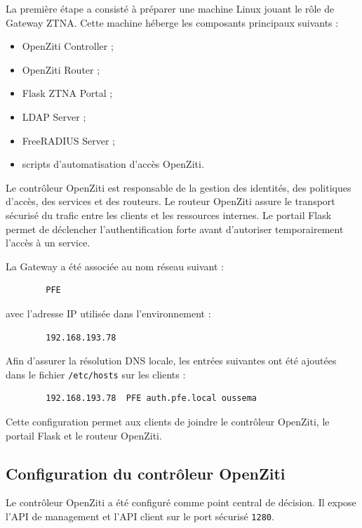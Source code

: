 \documentclass[12pt,a4paper,oneside]{report}
\begin{document}
	La première étape a consisté à préparer une machine Linux jouant le rôle de Gateway ZTNA. Cette machine héberge les composants principaux suivants :
	
	\begin{itemize}
		\item OpenZiti Controller ;
		\item OpenZiti Router ;
		\item Flask ZTNA Portal ;
		\item LDAP Server ;
		\item FreeRADIUS Server ;
		\item scripts d'automatisation d'accès OpenZiti.
	\end{itemize}
	
	Le contrôleur OpenZiti est responsable de la gestion des identités, des politiques d'accès, des services et des routeurs. Le routeur OpenZiti assure le transport sécurisé du trafic entre les clients et les ressources internes. Le portail Flask permet de déclencher l'authentification forte avant d'autoriser temporairement l'accès à un service.
	
	La Gateway a été associée au nom réseau suivant :
	
	\begin{lstlisting}
		PFE
	\end{lstlisting}
	
	avec l'adresse IP utilisée dans l'environnement :
	
	\begin{lstlisting}
		192.168.193.78
	\end{lstlisting}
	
	Afin d'assurer la résolution DNS locale, les entrées suivantes ont été ajoutées dans le fichier \texttt{/etc/hosts} sur les clients :
	
	\begin{lstlisting}
		192.168.193.78  PFE auth.pfe.local oussema
	\end{lstlisting}
	
	Cette configuration permet aux clients de joindre le contrôleur OpenZiti, le portail Flask et le routeur OpenZiti.
	
	\subsection{Configuration du contrôleur OpenZiti}
	
	Le contrôleur OpenZiti a été configuré comme point central de décision. Il expose l'API de management et l'API client sur le port sécurisé \texttt{1280}.
	
\end{document}
